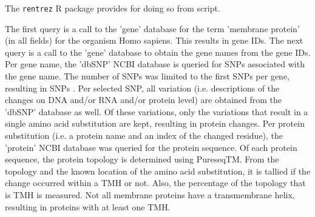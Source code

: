 The \verb;rentrez; R package provides for doing so from script.

The first query is a call to the 'gene' database for the 
term 'membrane protein' (in all fields) for the organism Homo sapiens.
This results in  gene IDs.
The next query is a call to the 'gene' database 
to obtain the gene names from the gene IDs.
Per gene name, the 'dbSNP' NCBI database is queried for 
SNPs associated with the gene name. The number of SNPs
was limited to the first  SNPs per gene,
resulting in  SNPs 
.
Per selected SNP, all variation (i.e. descriptions of the changes on DNA
and/or RNA and/or protein level) are obtained from the 'dbSNP' database
as well. Of these variations, only the variations that result in a single
amino acid substitution are kept, resulting in  protein changes.
Per protein substitution (i.e. a protein name and an index of the changed residue), 
the 'protein' NCBI database was queried for the
protein sequence.
Of each protein sequence, the protein topology is determined 
using PureseqTM.
From the topology and the known location of the amino acid substitution, 
it is tallied if the change occurred within a TMH or not.
Also, the percentage of the topology that is TMH is measured.
Not all membrane proteins have a transmembrane helix, resulting
in  proteins with at least one TMH. 



